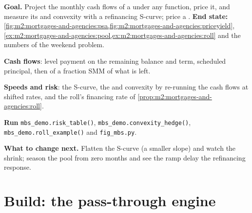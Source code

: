 \begin{tutorial}
\textbf{Goal.} Project the monthly cash flows of a  under any
 function, price it, and measure its  and
convexity with a refinancing S-curve; price a . \textbf{End state:}
\cref{fig:m2:mortgages-and-agencies:psa,fig:m2:mortgages-and-agencies:priceyield},
\cref{ex:m2:mortgages-and-agencies:pool,ex:m2:mortgages-and-agencies:roll} and
the numbers of the weekend problem.
\begin{tutsteps}
\item \textbf{Cash flows}: level payment on the remaining balance and term,
scheduled principal, then  of a fraction SMM of what is left.
\label{lst:m2:mortgages-and-agencies:flows}
\item \textbf{Speeds and risk}: the S-curve, the  and
convexity by re-running the cash flows at shifted rates, and the roll's
financing rate of \cref{prop:m2:mortgages-and-agencies:roll}.
\label{lst:m2:mortgages-and-agencies:risk}
\item \textbf{Run} \texttt{mbs\_demo.risk\_table()},
\texttt{mbs\_demo.convexity\_hedge()}, \texttt{mbs\_demo.roll\_example()}
and \texttt{fig\_mbs.py}.
\end{tutsteps}
\textbf{What to change next.} Flatten the S-curve (a smaller slope) and watch
the  shrink; season the pool from zero months and see the
ramp delay the refinancing response.
\end{tutorial}

\section{Build: the pass-through engine}\label{bld:m2:mortgages-and-agencies:prepay}

